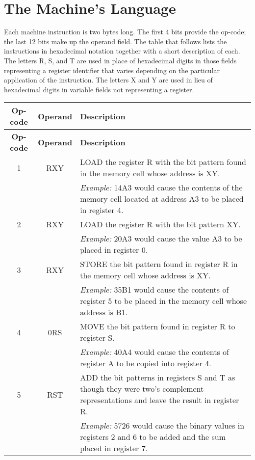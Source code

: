 \section{The Machine's Language}

Each machine instruction is two bytes long. The first 4 bits provide the op-code; the last 12 bits make up the operand field. The table that follows lists the instructions in hexadecimal notation together with a short description of each. The letters R, S, and T are used in place of hexadecimal digits in those fields representing a register identifier that varies depending on the particular application of the instruction. The letters X and Y are used in lieu of hexadecimal digits in variable fields not representing a register.

\begin{longtable}{|c|c|p{10cm}|}
\hline
\textbf{Op-code} & \textbf{Operand} & \textbf{Description} \\
\hline
\endfirsthead
\hline
\textbf{Op-code} & \textbf{Operand} & \textbf{Description} \\
\hline
\endhead
1 & RXY & LOAD the register R with the bit pattern found in the memory cell whose address is XY. \\
  &     & \textit{Example:} 14A3 would cause the contents of the memory cell located at address A3 to be placed in register 4. \\
\hline
2 & RXY & LOAD the register R with the bit pattern XY. \\
  &     & \textit{Example:} 20A3 would cause the value A3 to be placed in register 0. \\
\hline
3 & RXY & STORE the bit pattern found in register R in the memory cell whose address is XY. \\
  &     & \textit{Example:} 35B1 would cause the contents of register 5 to be placed in the memory cell whose address is B1. \\
\hline
4 & 0RS & MOVE the bit pattern found in register R to register S. \\
  &     & \textit{Example:} 40A4 would cause the contents of register A to be copied into register 4. \\
\hline
5 & RST & ADD the bit patterns in registers S and T as though they were two's complement representations and leave the result in register R. \\
  &     & \textit{Example:} 5726 would cause the binary values in registers 2 and 6 to be added and the sum placed in register 7. \\

\end{longtable}
